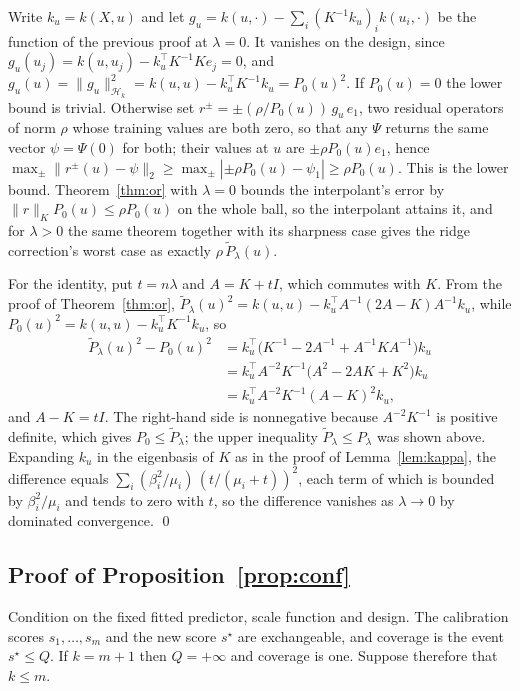 Write $k_u=k(X,u)$ and let $g_u=k(u,\cdot)-\sum_i(K^{-1}k_u)_ik(u_i,\cdot)$
be the function of the previous proof at $\lambda=0$. It vanishes on the
design, since $g_u(u_j)=k(u,u_j)-k_u^\top K^{-1}Ke_j=0$, and
$g_u(u)=\|g_u\|_{\mathcal H_k}^2=k(u,u)-k_u^\top K^{-1}k_u=P_0(u)^2$. If
$P_0(u)=0$ the lower bound is trivial. Otherwise set
$r^{\pm}=\pm(\rho/P_0(u))\,g_u\,e_1$, two residual operators of norm $\rho$
whose training values are both zero, so that any $\Psi$ returns the same
vector $\psi=\Psi(0)$ for both; their values at $u$ are $\pm\rho P_0(u)e_1$,
hence
$\max_\pm\|r^{\pm}(u)-\psi\|_2\ge\max_\pm|{\pm}\rho P_0(u)-\psi_1|\ge\rho
P_0(u)$. This is the lower bound. Theorem~\ref{thm:or} with $\lambda=0$
bounds the interpolant's error by $\|r\|_KP_0(u)\le\rho P_0(u)$ on the whole
ball, so the interpolant attains it, and for $\lambda>0$ the same theorem
together with its sharpness case gives the ridge correction's worst case
as exactly $\rho\,\widetilde P_\lambda(u)$.

For the identity, put $t=n\lambda$ and $A=K+tI$, which commutes with $K$.
From the proof of Theorem~\ref{thm:or},
$\widetilde P_\lambda(u)^2=k(u,u)-k_u^\top A^{-1}(2A-K)A^{-1}k_u$, while
$P_0(u)^2=k(u,u)-k_u^\top K^{-1}k_u$, so
\[
\begin{aligned}
\widetilde P_\lambda(u)^2-P_0(u)^2
&=k_u^\top\big(K^{-1}-2A^{-1}+A^{-1}KA^{-1}\big)k_u\\
&=k_u^\top A^{-2}K^{-1}\big(A^2-2AK+K^2\big)k_u\\
&=k_u^\top A^{-2}K^{-1}(A-K)^2k_u ,
\end{aligned}
\]
and $A-K=tI$. The right-hand side is nonnegative because $A^{-2}K^{-1}$ is
positive definite, which gives $P_0\le\widetilde P_\lambda$; the upper
inequality $\widetilde P_\lambda\le P_\lambda$ was shown above. Expanding
$k_u$ in the eigenbasis of $K$ as in the proof of Lemma~\ref{lem:kappa},
the difference equals $\sum_i(\beta_i^2/\mu_i)\,(t/(\mu_i+t))^2$, each term
of which is bounded by $\beta_i^2/\mu_i$ and tends to zero with $t$, so the
difference vanishes as $\lambda\to0$ by dominated convergence. \qed

\subsection{Proof of Proposition~\ref{prop:conf}}
\label{proof:prop:conf}

Condition on the fixed fitted predictor, scale function and design. The
calibration scores $s_1,\ldots,s_m$ and the new score $s^\star$ are
exchangeable, and coverage is the event $s^\star\le Q$. If $k=m+1$ then
$Q=+\infty$ and coverage is one. Suppose therefore that $k\le m$.

